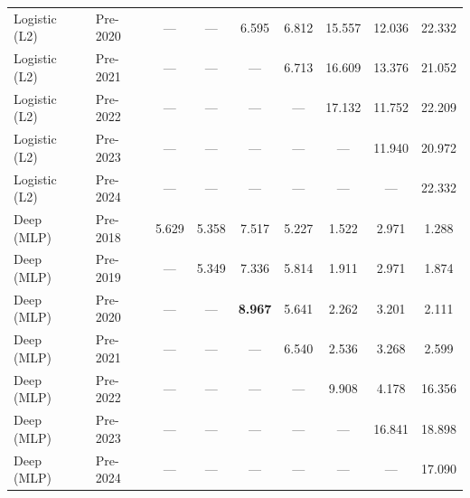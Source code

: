 \begin{table}[htbp]
{\begin{tabular}{l lccccccc}
Logistic (L2) & Pre-2020 & --- & --- & 6.595 & 6.812 & 15.557 & 12.036 & 22.332 \\
Logistic (L2) & Pre-2021 & --- & --- & --- & 6.713 & 16.609 & 13.376 & 21.052 \\
Logistic (L2) & Pre-2022 & --- & --- & --- & --- & 17.132 & 11.752 & 22.209 \\
Logistic (L2) & Pre-2023 & --- & --- & --- & --- & --- & 11.940 & 20.972 \\
Logistic (L2) & Pre-2024 & --- & --- & --- & --- & --- & --- & 22.332 \\
Deep (MLP) & Pre-2018 & 5.629 & 5.358 & 7.517 & 5.227 & 1.522 & 2.971 & 1.288 \\
Deep (MLP) & Pre-2019 & --- & 5.349 & 7.336 & 5.814 & 1.911 & 2.971 & 1.874 \\
Deep (MLP) & Pre-2020 & --- & --- & \textbf{8.967} & 5.641 & 2.262 & 3.201 & 2.111 \\
Deep (MLP) & Pre-2021 & --- & --- & --- & 6.540 & 2.536 & 3.268 & 2.599 \\
Deep (MLP) & Pre-2022 & --- & --- & --- & --- & 9.908 & 4.178 & 16.356 \\
Deep (MLP) & Pre-2023 & --- & --- & --- & --- & --- & 16.841 & 18.898 \\
Deep (MLP) & Pre-2024 & --- & --- & --- & --- & --- & --- & 17.090 \\
\bottomrule
\end{tabular}%
}
\end{table}